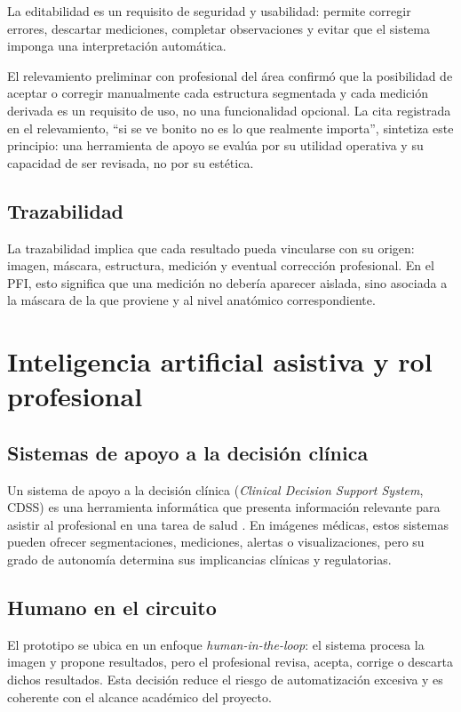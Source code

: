 La editabilidad es un requisito de seguridad y usabilidad: permite corregir errores, descartar mediciones, completar observaciones y evitar que el sistema imponga una interpretación automática.

El relevamiento preliminar con profesional del área confirmó que la posibilidad de aceptar o corregir manualmente cada estructura segmentada y cada medición derivada es un requisito de uso, no una funcionalidad opcional. La cita registrada en el relevamiento, ``si se ve bonito no es lo que realmente importa'', sintetiza este principio: una herramienta de apoyo se evalúa por su utilidad operativa y su capacidad de ser revisada, no por su estética.

\subsection{Trazabilidad}

La trazabilidad implica que cada resultado pueda vincularse con su origen: imagen, máscara, estructura, medición y eventual corrección profesional. En el PFI, esto significa que una medición no debería aparecer aislada, sino asociada a la máscara de la que proviene y al nivel anatómico correspondiente.

\section{Inteligencia artificial asistiva y rol profesional}

\subsection{Sistemas de apoyo a la decisión clínica}

Un sistema de apoyo a la decisión clínica (\textit{Clinical Decision Support System}, CDSS) es una herramienta informática que presenta información relevante para asistir al profesional en una tarea de salud \parencite{berner_cdss_2007}. En imágenes médicas, estos sistemas pueden ofrecer segmentaciones, mediciones, alertas o visualizaciones, pero su grado de autonomía determina sus implicancias clínicas y regulatorias.

\subsection{Humano en el circuito}

El prototipo se ubica en un enfoque \textit{human-in-the-loop}: el sistema procesa la imagen y propone resultados, pero el profesional revisa, acepta, corrige o descarta dichos resultados. Esta decisión reduce el riesgo de automatización excesiva y es coherente con el alcance académico del proyecto.

